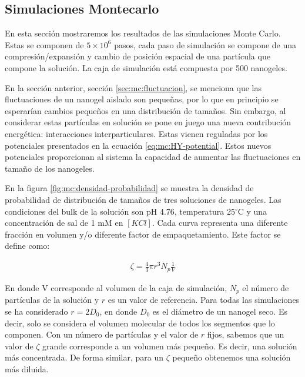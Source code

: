 	
	\subsection{Simulaciones Montecarlo}
	
	En esta secci\'on mostraremos los resultados de las simulaciones Monte Carlo. Estas se componen de  $5\times 10^6$ pasos, cada paso de simulaci\'on se compone de una compresi\'on/expansi\'on y cambio de posici\'on espacial de una part\'icula que compone la soluci\'on. La caja de simulaci\'on est\'a compuesta por 500 nanogeles.
	
	En la secci\'on anterior, secci\'on \ref{sec:mc:fluctuacion}, se menciona que las fluctuaciones de un nanogel aislado son peque\~nas, por lo que en principio se esperar\'ian cambios peque\~nos en una distribuci\'on de tama\~nos. Sin embargo, al considerar estas part\'iculas en soluci\'on se pone en juego una nueva contribuci\'on energ\'etica: interacciones interparticulares. Estas vienen reguladas por los potenciales presentados en la ecuaci\'on \ref{eq:mc:HY-potential}.
	Estos nuevos potenciales proporcionan al sistema la capacidad de aumentar las fluctuaciones en tama\~no de los nanogeles. %
	
	En la figura \ref{fig:mc:densidad-probabilidad} se muestra la densidad de probabilidad de distribuci\'on de tama\~nos de tres soluciones de nanogeles. Las condiciones del bulk de la soluci\'on son pH 4.76, temperatura 25$^\circ$C y una concentraci\'on de sal de 1 mM en $[KCl]$.
	Cada curva representa una diferente fracci\'on en volumen y/o diferente factor de empaquetamiento. Este factor se define como:
	
	
	
	\begin{align}
		\zeta = \frac{4}{3} \pi r^3 N_p \frac{1}{V}
	\end{align}
	
	En donde V corresponde al volumen de la caja de simulación, $N_p$ el n\'umero de part\'iculas de la soluci\'on y $r$ es un valor de referencia.
	Para todas las simulaciones se ha considerado $r= 2D_0$, en donde $D_0$ es el di\'ametro de un nanogel seco. Es decir, solo se considera el volumen molecular de todos los segmentos que lo componen.
	Con un n\'umero de part\'iculas y el valor de $r$ fijos, sabemos que un valor de $\zeta$ grande corresponde a un volumen m\'as peque\~no. Es decir, una soluci\'on m\'as concentrada.
	De forma similar, para un $\zeta$ peque\~no obtenemos una soluci\'on m\'as diluida.
	
